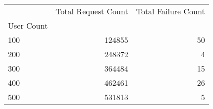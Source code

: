 \begin{tabular}{lrr}
\toprule
 & Total Request Count & Total Failure Count \\
User Count &  &  \\
\midrule
100 & 124855 & 50 \\
200 & 248372 & 4 \\
300 & 364484 & 15 \\
400 & 462461 & 26 \\
500 & 531813 & 5 \\
\bottomrule
\end{tabular}

